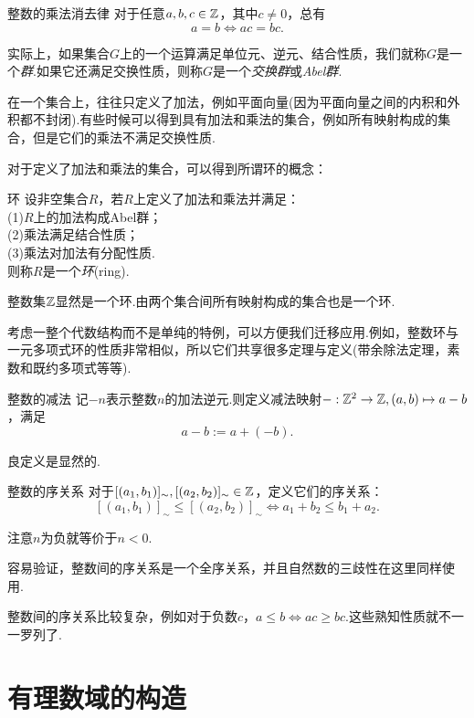 \begin{corollary}{整数的乘法消去律}
	对于任意$a,b,c \in \mathbb{Z}$，其中$c \neq 0$，总有$$a=b \Leftrightarrow ac=bc.$$
\end{corollary}

实际上，如果集合$G$上的一个运算满足单位元、逆元、结合性质，我们就称$G$是一个\textit{群}.如果它还满足交换性质，则称$G$是一个\textit{交换群}或\textit{Abel群}.

在一个集合上，往往只定义了加法，例如平面向量(因为平面向量之间的内积和外积都不封闭).有些时候可以得到具有加法和乘法的集合，例如所有映射构成的集合，但是它们的乘法不满足交换性质.

对于定义了加法和乘法的集合，可以得到所谓环的概念：

\begin{axiom}{环}
	设非空集合$R$，若$R$上定义了加法和乘法并满足： \\
	(1)$R$上的加法构成Abel群； \\
	(2)乘法满足结合性质； \\
	(3)乘法对加法有分配性质. \\
	则称$R$是一个\textit{环}(ring).
\end{axiom}

整数集$\mathbb{Z}$显然是一个环.由两个集合间所有映射构成的集合也是一个环.

考虑一整个代数结构而不是单纯的特例，可以方便我们迁移应用.例如，整数环与一元多项式环的性质非常相似，所以它们共享很多定理与定义(带余除法定理，素数和既约多项式等等).

\begin{definition}{整数的减法}
	记$-n$表示整数$n$的加法逆元.则定义减法映射$-:\mathbb{Z} ^2 \to \mathbb{Z} ,(a,b) \mapsto a-b$，满足$$a-b:=a+(-b).$$
\end{definition}

良定义是显然的.

\begin{definition}{整数的序关系}
	对于$[(a_1,b_1)]_{\sim},[(a_2,b_2)]_{\sim} \in \mathbb{Z}$，定义它们的序关系：$$[(a_1,b_1)]_{\sim} \leq [(a_2,b_2)]_{\sim} \Leftrightarrow a_1+b_2 \leq b_1+a_2.$$
\end{definition}

注意$n$为负就等价于$n<0$.

容易验证，整数间的序关系是一个全序关系，并且自然数的三歧性在这里同样使用.

整数间的序关系比较复杂，例如对于负数$c$，$a \leq b \Leftrightarrow ac \geq bc$.这些熟知性质就不一一罗列了.

\section{有理数域的构造}


